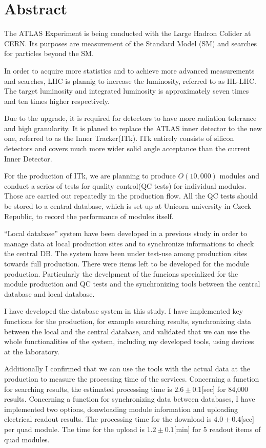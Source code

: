 \chapter*{Abstract}

The ATLAS Experiment is being conducted with the Large Hadron Colider at CERN. Its purposes are measurement of the Standard Model (SM) and searches for particles beyond the SM.

In order to acquire more statistics and to achieve more advanced measurements and searches, LHC is plannig to increase the luminosity, referred to as HL-LHC.
The target luminosity and integrated luminosity is approximately seven times and ten times higher respectively.

Due to the upgrade, it is required for detectors to have more radiation tolerance and high granularity. 
It is planed to replace the ATLAS inner detector to the new one, referred to as the Inner Tracker(ITk). 
ITk entirely consists of silicon detectors and covers much more wider solid angle acceptance than the current Inner Detector.

For the production of ITk, we are planning to produce $O(10,000)$ modules and conduct a series of tests for quality control(QC tests) for individual modules. 
Those are carried out repeatedly in the production flow.
All the QC tests should be stored to a central database, which is set up at Unicorn university in Czeck Republic, to record the performance of modules itself. 

``Local database'' system have been developed in a previous study in order to manage data at local production sites and to synchronize informations to check the central DB. The system have been under test-use among production sites towards full production.
There were items left to be developed for the module production. Particularly the develpment of the funcions specialized for the module production and QC tests and the synchronizing tools between the central database and local database.

I have developed the database system in this study.
I have implemented key functions for the production, for example searching results, synchronizing data between the local and the central database, and validated that we can use the whole functionalities of the system, including my developed tools, using devices at the laboratory. 

Additionally I confirmed that we can use the tools with the actual data at the production to measure the processing time of the services.
Concerning a function for searching results, the estimated processing time is $2.6\pm 0.1$[sec] for 84,000 results.
Concerning a function for synchronizing data between databases, I have implemented two options, donwloading module information and uploading electrical readout results.
The processing time for the download is $4.0\pm 0.4$[sec] per quad module.
The time for the upload is $1.2\pm 0.1$[min] for 5 readout items of quad modules.


